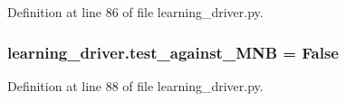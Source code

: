 Definition at line 86 of file learning\+\_\+driver.\+py.

\hypertarget{namespacelearning__driver_a5246f10c0d1e0b4f4df3597928bfbe22}{
\subsubsection[{test\+\_\+against\+\_\+\+M\+N\+B}]{\setlength{\rightskip}{0pt plus 5cm}learning\+\_\+driver.\+test\+\_\+against\+\_\+\+M\+N\+B = False}}\label{namespacelearning__driver_a5246f10c0d1e0b4f4df3597928bfbe22}


Definition at line 88 of file learning\+\_\+driver.\+py.

